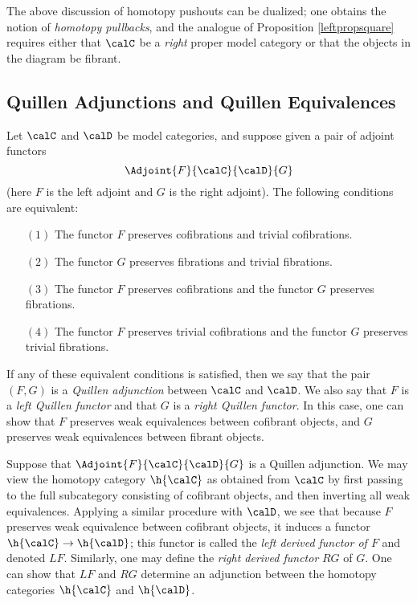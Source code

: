 \begin{remark}
The above discussion of homotopy pushouts can be dualized; one obtains the notion of {\it homotopy pullbacks}, and the analogue of Proposition \ref{leftpropsquare} requires either that $\calC$ be a {\em right} proper model category or that the objects in the diagram be fibrant.
\end{remark}

\subsection{Quillen Adjunctions and Quillen Equivalences}\label{quilladj}

Let $\calC$ and $\calD$ be model categories, and suppose given a pair of adjoint functors
$$ \Adjoint{F}{\calC}{\calD}{G} $$
(here $F$ is the left adjoint and $G$ is the right adjoint). The following conditions are equivalent:

\begin{itemize}
\item[$(1)$] The functor $F$ preserves cofibrations and trivial cofibrations.

\item[$(2)$] The functor $G$ preserves fibrations and trivial fibrations.

\item[$(3)$] The functor $F$ preserves cofibrations and the functor $G$ preserves fibrations.

\item[$(4)$] The functor $F$ preserves trivial cofibrations and the functor $G$ preserves trivial fibrations.
\end{itemize}

If any of these equivalent conditions is satisfied, then we say that the pair $(F,G)$ is a {\it Quillen adjunction} between $\calC$ and $\calD$. We also say that $F$ is a {\it left Quillen functor} and that $G$ is a {\it right Quillen functor}. In this case, one can show that $F$ preserves weak equivalences between cofibrant objects, and $G$ preserves weak equivalences between fibrant objects.

Suppose that $\Adjoint{F}{\calC}{\calD}{G} $ is a Quillen adjunction.
We may view the homotopy category $\h{\calC}$ as obtained from $\calC$ by first passing to the full subcategory consisting of cofibrant objects, and then inverting all weak equivalences. Applying a similar procedure with $\calD$, we see that because $F$ preserves weak equivalence between cofibrant objects, it induces a functor $\h{\calC} \rightarrow \h{\calD}$; this functor is called the {\it left derived functor of $F$} and denoted $LF$. Similarly, one may define the {\it right derived functor} $RG$ of $G$. One can show that $LF$ and $RG$ determine an adjunction between the homotopy categories $\h{\calC}$ and $\h{\calD}$. 

